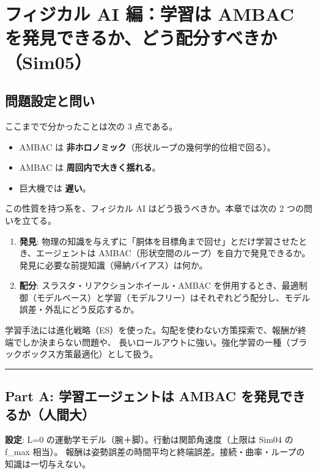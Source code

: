 \chapter{フィジカル AI 編：学習は AMBAC を発見できるか、どう配分すべきか（Sim05）}\label{ch:ai}

\section{問題設定と問い}

ここまでで分かったことは次の 3 点である。

\begin{itemize}
\tightlist
\item
  AMBAC は \textbf{非ホロノミック}（形状ループの幾何学的位相で回る）。
\item
  AMBAC は \textbf{周回内で大きく揺れる}。
\item
  巨大機では \textbf{遅い}。
\end{itemize}

この性質を持つ系を、フィジカル AI はどう扱うべきか。本章では次の 2 つの問いを立てる。

\begin{enumerate}
\def\labelenumi{\arabic{enumi}.}
\tightlist
\item
  \textbf{発見}: 物理の知識を与えずに「胴体を目標角まで回せ」とだけ学習させたとき、エージェントは AMBAC（形状空間のループ）を自力で発見できるか。発見に必要な前提知識（帰納バイアス）は何か。
\item
  \textbf{配分}: スラスタ・リアクションホイール・AMBAC を併用するとき、最適制御（モデルベース）と学習（モデルフリー）はそれぞれどう配分し、モデル誤差・外乱にどう反応するか。
\end{enumerate}

学習手法には進化戦略（ES）を使った。勾配を使わない方策探索で、報酬が終端でしか決まらない問題や、 長いロールアウトに強い。強化学習の一種（ブラックボックス方策最適化）として扱う。

\begin{center}\rule{0.5\linewidth}{0.5pt}\end{center}

\section{Part A: 学習エージェントは AMBAC を発見できるか（人間大）}


\textbf{設定}: L=0 の運動学モデル（腕＋脚）。行動は関節角速度（上限は Sim04 の f\_max 相当）。 報酬は姿勢誤差の時間平均と終端誤差。接続・曲率・ループの知識は一切与えない。

